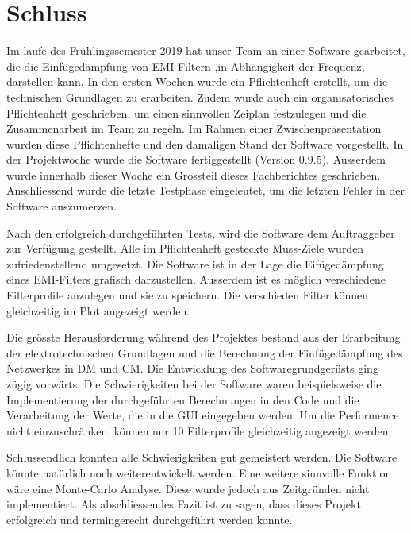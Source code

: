 \section{Schluss} \label{sec:schluss}

Im laufe des Frühlingssemester 2019 hat unser Team an einer Software gearbeitet, die die Einfügedämpfung von EMI-Filtern ,in Abhängigkeit der Frequenz, darstellen kann. In den ersten Wochen wurde ein Pflichtenheft erstellt, um die technischen Grundlagen zu erarbeiten. Zudem wurde auch ein organisatorisches Pflichtenheft geschrieben, um einen sinnvollen Zeiplan festzulegen und die Zusammenarbeit im Team zu regeln. 
Im Rahmen einer Zwischenpräsentation wurden diese Pflichtenhefte und den damaligen Stand der Software vorgestellt. In der Projektwoche wurde die Software fertiggestellt (Version 0.9.5). Ausserdem wurde innerhalb dieser Woche ein Grossteil dieses Fachberichtes geschrieben. Anschliessend wurde die letzte Testphase eingeleutet, um die letzten Fehler in der Software auszumerzen.   
 
Nach den erfolgreich durchgeführten Tests, wird die Software dem Auftraggeber zur Verfügung gestellt. Alle im Pflichtenheft gesteckte Muss-Ziele wurden zufriedenstellend umgesetzt. Die Software ist in der Lage die Eifügedämpfung eines EMI-Filters grafisch darzustellen. Ausserdem ist es möglich verschiedene Filterprofile anzulegen und sie zu speichern. Die verschieden Filter können gleichzeitig im Plot angezeigt werden. 

Die grösste Herausforderung während des Projektes bestand aus der Erarbeitung der elektrotechnischen Grundlagen und die Berechnung der Einfügedämpfung des Netzwerkes in DM und CM. Die Entwicklung des Softwaregrundgerüsts ging zügig vorwärts. Die Schwierigkeiten bei der Software waren beispielsweise die Implementierung der durchgeführten Berechnungen in den Code und die Verarbeitung der Werte, die in die GUI eingegeben werden. Um die Performence nicht einzuschränken, können nur 10 Filterprofile gleichzeitig angezeigt werden.

Schlussendlich konnten alle Schwierigkeiten gut gemeistert werden. Die Software könnte natürlich noch weiterentwickelt werden.  Eine weitere sinnvolle Funktion wäre eine Monte-Carlo Analyse. Diese wurde jedoch aus Zeitgründen nicht implementiert. Als abschliessendes Fazit ist zu sagen, dass dieses Projekt erfolgreich und termingerecht durchgeführt werden konnte. 
